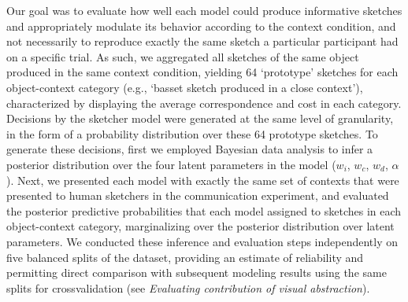 \documentclass[9pt,twocolumn,twoside]{pnas-new}
\newcommand{\rdh}[1]{{\color{blue}{[rdh: #1]}}}
\begin{document}

Our goal was to evaluate how well each model could produce informative sketches and appropriately modulate its behavior according to the context condition, and not necessarily to reproduce exactly the same sketch a particular participant had on a specific trial. 
As such, we aggregated all sketches of the same object produced in the same context condition, yielding 64 `prototype' sketches for each object-context category (e.g., `basset sketch produced in a close context'), characterized by displaying the average correspondence and cost in each category. 
Decisions by the sketcher model were generated at the same level of granularity, in the form of a probability distribution over these 64 prototype sketches. 
To generate these decisions, first we employed Bayesian data analysis to infer a posterior distribution over the four latent parameters in the model ($w_{i}$, $w_{c}$, $w_{d}$, $\alpha$). 
Next, we presented each model with exactly the same set of contexts that were presented to human sketchers in the communication experiment, and evaluated the posterior predictive probabilities that each model assigned to sketches in each object-context category, marginalizing over the posterior distribution over latent parameters. 
We conducted these inference and evaluation steps independently on five balanced splits of the dataset, providing an estimate of reliability and permitting direct comparison with subsequent modeling results using the same splits for crossvalidation (see \textit{Evaluating contribution of visual abstraction}). 
\end{document}

